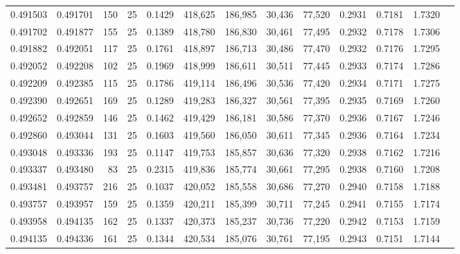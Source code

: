 \begin{tabular}{rrrrrrrrrrrrr}
0.491503 & 0.491701 &   150 &  25 &                                     0.1429 & 418,625 & 186,985 &  30,436 &  77,520 & 0.2931 & 0.7181 & 1.7320 \\
0.491702 & 0.491877 &   155 &  25 &                                     0.1389 & 418,780 & 186,830 &  30,461 &  77,495 & 0.2932 & 0.7178 & 1.7306 \\
0.491882 & 0.492051 &   117 &  25 &                                     0.1761 & 418,897 & 186,713 &  30,486 &  77,470 & 0.2932 & 0.7176 & 1.7295 \\
0.492052 & 0.492208 &   102 &  25 &                                     0.1969 & 418,999 & 186,611 &  30,511 &  77,445 & 0.2933 & 0.7174 & 1.7286 \\
0.492209 & 0.492385 &   115 &  25 &                                     0.1786 & 419,114 & 186,496 &  30,536 &  77,420 & 0.2934 & 0.7171 & 1.7275 \\
0.492390 & 0.492651 &   169 &  25 &                                     0.1289 & 419,283 & 186,327 &  30,561 &  77,395 & 0.2935 & 0.7169 & 1.7260 \\
0.492652 & 0.492859 &   146 &  25 &                                     0.1462 & 419,429 & 186,181 &  30,586 &  77,370 & 0.2936 & 0.7167 & 1.7246 \\
0.492860 & 0.493044 &   131 &  25 &                                     0.1603 & 419,560 & 186,050 &  30,611 &  77,345 & 0.2936 & 0.7164 & 1.7234 \\
0.493048 & 0.493336 &   193 &  25 &                                     0.1147 & 419,753 & 185,857 &  30,636 &  77,320 & 0.2938 & 0.7162 & 1.7216 \\
0.493337 & 0.493480 &    83 &  25 &                                     0.2315 & 419,836 & 185,774 &  30,661 &  77,295 & 0.2938 & 0.7160 & 1.7208 \\
0.493481 & 0.493757 &   216 &  25 &                                     0.1037 & 420,052 & 185,558 &  30,686 &  77,270 & 0.2940 & 0.7158 & 1.7188 \\
0.493757 & 0.493957 &   159 &  25 &                                     0.1359 & 420,211 & 185,399 &  30,711 &  77,245 & 0.2941 & 0.7155 & 1.7174 \\
0.493958 & 0.494135 &   162 &  25 &                                     0.1337 & 420,373 & 185,237 &  30,736 &  77,220 & 0.2942 & 0.7153 & 1.7159 \\
0.494135 & 0.494336 &   161 &  25 &                                     0.1344 & 420,534 & 185,076 &  30,761 &  77,195 & 0.2943 & 0.7151 & 1.7144 \\

\end{tabular}
